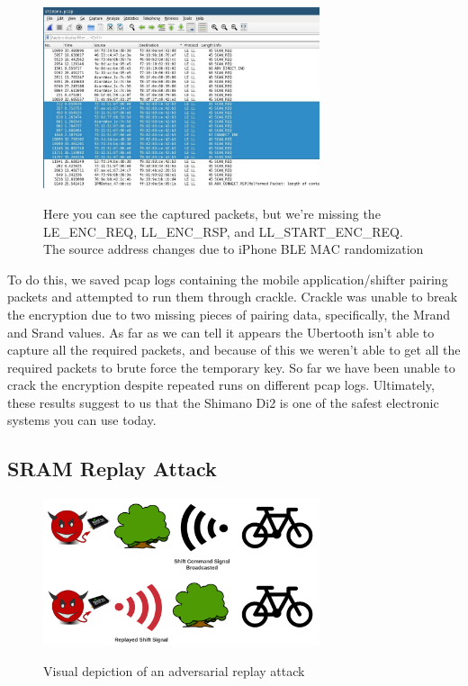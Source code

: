 \documentclass[letterpaper,twocolumn,10pt]{article}
\begin{document}
\begin{figure}[ht]
  \begin{center}
    \centering
    \includegraphics[width=230pt]{images/shimano-crackle.jpeg}
    \label{fig:Replay}
  \end{center}
  \caption{Here you can see the captured packets, but we're missing the LE\_ENC\_REQ, LL\_ENC\_RSP, and LL\_START\_ENC\_REQ. The source address changes due to iPhone BLE MAC randomization}
\end{figure}

To do this, we saved pcap logs containing the mobile application/shifter pairing packets and attempted to run them through crackle. Crackle was unable to break the encryption due to two missing pieces of pairing data, specifically, the Mrand and Srand values. As far as we can tell it appears the Ubertooth isn't able to capture all the required packets, and because of this we weren't able to get all the required packets to brute force the temporary key. So far we have been unable to crack the encryption despite repeated runs on different pcap logs. Ultimately, these results suggest to us that the Shimano Di2 is one of the safest electronic systems you can use today.

\subsection{SRAM Replay Attack}

\begin{figure}[ht]
  \begin{center}
    \centering
    \includegraphics[width=230pt]{images/replay.png}
    \label{fig:Replay}
  \end{center}
  \caption{Visual depiction of an adversarial replay attack}
\end{figure}
\end{document}
